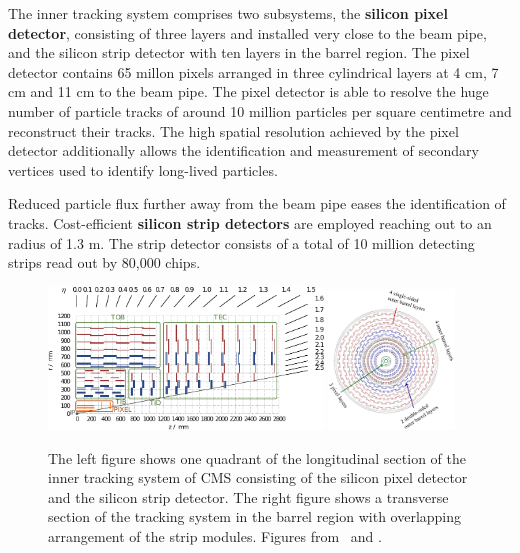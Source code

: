 The inner tracking system comprises two subsystems, the \textbf{silicon pixel
detector}, consisting of three layers and installed very close to the beam pipe,
and the silicon strip detector with ten layers in the barrel region. The pixel
detector contains 65 millon pixels arranged in three cylindrical layers at 4 cm,
7 cm and 11 cm to the beam pipe. The pixel detector is able to resolve the huge
number of particle tracks of around 10 million particles per square centimetre
and reconstruct their tracks. The high spatial resolution achieved by the pixel
detector additionally allows the identification and measurement of secondary
vertices used to identify long-lived particles.

Reduced particle flux further away from the beam pipe eases the identification
of tracks. Cost-efficient \textbf{silicon strip detectors} are employed reaching out to
an radius of 1.3 m. The strip detector consists of a total of 10 million
detecting strips read out by 80,000 chips. 

\begin{figure}[htp]
    \centering
    \includegraphics[width=0.65\textwidth]{figures/cms_detector/tracker.pdf}\hfill
    \includegraphics[width=0.3\textwidth]{figures/cms_detector/tracking_sytem_barrel_slice.png}
    \caption[Inner Tracking System]{The left figure shows one quadrant of the
        longitudinal section of the inner tracking system of CMS consisting of the
        silicon pixel detector and the silicon strip detector. The right figure shows a
        transverse section of the tracking system in the barrel region with overlapping
        arrangement of the strip modules. Figures from~\cite{Berger:2014aca} and
        \cite{cmsweb:innertracker}.}
    \label{fig:cms:inner_tracking}
\end{figure}

